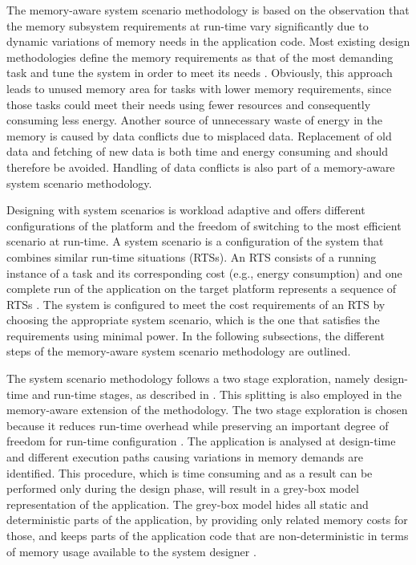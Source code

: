 \documentclass[smallcondensed]{svjour3}
\begin{document}
The memory-aware system scenario methodology is based on the observation that the memory subsystem requirements at run-time vary significantly due to dynamic variations of memory needs in the application code. 
Most existing design methodologies define the memory requirements as that of the most demanding task and tune the system in order to meet its needs \cite{tcm}. 
Obviously, this approach leads to unused memory area for tasks with lower memory requirements, since those tasks could meet their needs using fewer resources and consequently consuming less energy. 
Another source of unnecessary waste of energy in the memory is caused by data conflicts due to misplaced data. 
Replacement of old data and fetching of new data is both time and energy consuming and should therefore be avoided. 
Handling of data conflicts is also part of a memory-aware system scenario methodology.

Designing with system scenarios is workload adaptive and offers different configurations of the platform and the freedom of switching to the most efficient scenario at run-time. 
A system scenario is a configuration of the system that combines similar run-time situations (RTSs). 
An RTS consists of a running instance of a task and its corresponding cost (e.g., energy consumption) and one complete run of the application on the target platform represents a sequence of RTSs \cite{Elena2010}. 
The system is configured to meet the cost requirements of an RTS by choosing the appropriate system scenario, which is the one that satisfies the requirements using minimal power. 
In the following subsections, the different steps of the memory-aware system scenario methodology are outlined. 

The system scenario methodology follows a two stage exploration, namely design-time and run-time stages, as described in \cite{Gheorghita2007}. 
This splitting is also employed in the memory-aware extension of the methodology. 
The two stage exploration is chosen because it reduces run-time overhead while preserving an important degree of freedom for run-time configuration \cite{tcm}. 
The application is analysed at design-time and different execution paths causing variations in memory demands are identified. 
This procedure, which is time consuming and as a result can be performed only during the design phase, will result in a grey-box model representation of the application. 
The grey-box model hides all static and deterministic parts of the application, by providing only related memory costs for those, and keeps parts of the application code that are non-deterministic in terms of memory usage available to the system designer \cite{graybox}. 
\end{document}
